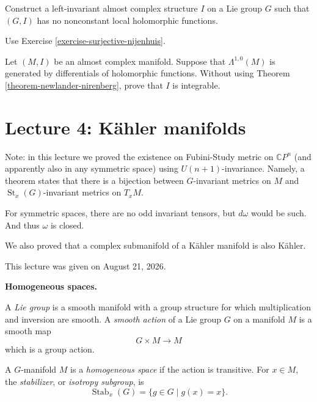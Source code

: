 \begin{exercise}[Optional]
\label{exercise-left-invariant-no-functions}
Construct a left-invariant almost complex
structure $I$ on a Lie group $G$ such that
$(G,I)$ has no nonconstant local
holomorphic functions.
\end{exercise}

Use Exercise
\ref{exercise-surjective-nijenhuis}.

\begin{exercise}
\label{exercise-holomorphic-generators}
Let $(M,I)$ be an almost complex manifold.
Suppose that $\Lambda^{1,0}(M)$ is generated
by differentials of holomorphic functions.
Without using Theorem
\ref{theorem-newlander-nirenberg}, prove
that $I$ is integrable.
\end{exercise}

\section{Lecture 4: K\"ahler manifolds}
\label{section-lecture-four-kahler}

\noindent
Note: in this lecture we proved
the existence on Fubini-Study metric
on $\mathbb{C}P^n$ (and apparently also
in any symmetric space)
using $U(n+1)$-invariance.
Namely, a theorem states that there
is a bijection between $G$-invariant
metrics on $M$ and
$\operatorname{St}_x(G)$-invariant
metrics on $T_xM$.

For symmetric spaces, there are no
odd invariant tensors,
but $d \omega$ would be such.
And thus $\omega$ is closed.

We also proved that a complex
submanifold of a Kähler manifold is also
Kähler.

\medskip\noindent
{\bf }This lecture was given on August 21,
2026.

\medskip\noindent
{\bf Homogeneous spaces.}

\begin{definition}
\label{definition-lie-group-action}
A {\it Lie group} is a smooth manifold with
a group structure for which multiplication
and inversion are smooth. A
{\it smooth action} of a Lie group $G$ on a
manifold $M$ is a smooth map
$$
G\times M\longrightarrow M
$$
which is a group action.
\end{definition}

\begin{definition}
\label{definition-homogeneous-space}
A $G$-manifold $M$ is a
{\it homogeneous space} if the action is
transitive. For $x\in M$, the
{\it stabilizer}, or
{\it isotropy subgroup}, is
$$
\operatorname{Stab}_x(G)
=\{g\in G\mid g(x)=x\}.
$$
\end{definition}

